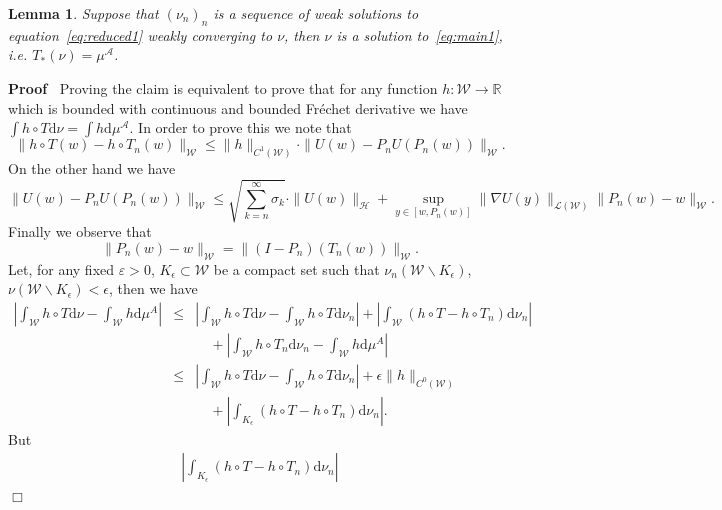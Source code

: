\documentclass[a4paper,10pt]{article}
\newcommand{\asterisk}{\mathord{*}}
\newcommand{\mathd}{\mathrm{d}}
\newenvironment{proof}{\noindent\textbf{Proof\ }}{\hspace*{\fill}$\Box$\medskip}
\newtheorem{lemma}[theorem]{Lemma}
\begin{document}
\begin{lemma}
  \label{lemma_reduced4}Suppose that $(\nu_n)_n$ is a sequence of weak
  solutions to equation~{\eqref{eq:reduced1}} weakly converging to $\nu$, then
  $\nu$ is a solution to~{\eqref{eq:main1}}, i.e. $T_{\asterisk} (\nu) =
  \mu^{\mathcal{A}}$.
\end{lemma}

\begin{proof}
  Proving the claim is equivalent to prove that for any function $h :
  \mathcal{W} \rightarrow \mathbb{R}$ which is bounded with continuous and
  bounded Fr{\'e}chet derivative we have $\int h \circ T \mathd \nu = \int h
  \mathd \mu^{\mathcal{A}}$. In order to prove this we note that
  \[ \| h \circ T (w) - h \circ T_n (w) \|_{\mathcal{W}} \leqslant \| h
     \|_{C^1 (\mathcal{W})} \cdot \| U (w) - P_n U (P_n (w)) \|_{\mathcal{W}}
     . \]
  On the other hand we have
  \[ \| U (w) - P_n U (P_n (w)) \|_{\mathcal{W}} \leqslant \sqrt{\sum_{k =
     n}^{\infty} \sigma_k} \cdot \| U (w) \|_{\mathcal{H}} + \sup_{y \in [w,
     P_n (w)]} \| \nabla U (y) \|_{\mathcal{L} (\mathcal{W})} \| P_n (w) - w
     \|_{\mathcal{W}} . \]
  Finally we observe that
  \[ \| P_n (w) - w \|_{\mathcal{W}} = \| (I - P_n) (T_n (w)) \|_{\mathcal{W}}
     . \]
  Let, for any fixed $\varepsilon > 0$, $K_{\epsilon} \subset \mathcal{W}$ be
  a compact set such that $\nu_n (\mathcal{W} \backslash K_{\epsilon})$, $\nu
  (\mathcal{W} \backslash K_{\epsilon}) < \epsilon$, then we have
  \begin{eqnarray}
    \left| \int_{\mathcal{W}} h \circ T \mathd \nu - \int_{\mathcal{W}} h
    \mathd \mu^A \right| & \leqslant & \left| \int_{\mathcal{W}} h \circ T
    \mathd \nu - \int_{\mathcal{W}} h \circ T \mathd \nu_n \right| + \left|
    \int_{\mathcal{W}} (h \circ T - h \circ T_n) \mathd \nu_n \right|
    \nonumber\\
    &  & \quad + \left| \int_{\mathcal{W}} h \circ T_n \mathd \nu_n -
    \int_{\mathcal{W}} h \mathd \mu^A \right| \nonumber\\
    & \leqslant & \left| \int_{\mathcal{W}} h \circ T \mathd \nu -
    \int_{\mathcal{W}} h \circ T \mathd \nu_n \right| + \epsilon \| h \|_{C^0
    (\mathcal{W})} \nonumber\\
    &  & \quad + \left| \int_{K_{\epsilon}} (h \circ T - h \circ T_n) \mathd
    \nu_n \right| .  \label{eq:reduced5}
  \end{eqnarray}
  But
  \begin{eqnarray}
    \left| \int_{K_{\epsilon}} (h \circ T - h \circ T_n) \mathd \nu_n \right|

\end{eqnarray}
\end{proof}
\end{document}
